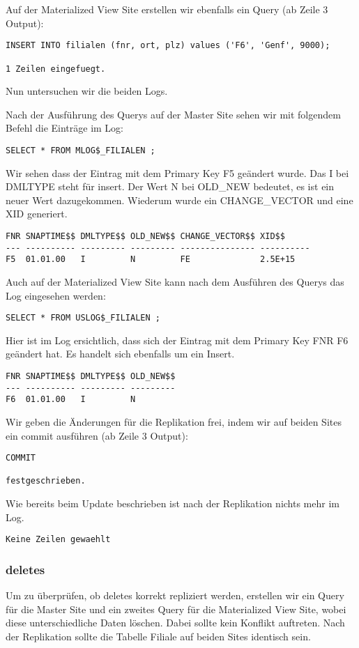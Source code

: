 \documentclass[11pt,a4paper,parskip=half]{scrartcl}
\begin{document}
Auf der Materialized View Site erstellen wir ebenfalls ein Query (ab Zeile 3 Output):
\begin{lstlisting}
INSERT INTO filialen (fnr, ort, plz) values ('F6', 'Genf', 9000);

1 Zeilen eingefuegt.
\end{lstlisting}

Nun untersuchen wir die beiden Logs.

Nach der Ausführung des Querys auf der Master Site sehen wir mit folgendem Befehl die Einträge im Log:
\begin{lstlisting}
SELECT * FROM MLOG$_FILIALEN ;
\end{lstlisting}

Wir sehen dass der Eintrag mit dem Primary Key F5 geändert wurde. Das I bei DMLTYPE steht für insert. Der Wert N bei OLD\_NEW bedeutet, es ist ein neuer Wert dazugekommen. Wiederum wurde ein CHANGE\_VECTOR und eine XID generiert.
\begin{lstlisting}
FNR SNAPTIME$$ DMLTYPE$$ OLD_NEW$$ CHANGE_VECTOR$$ XID$$
--- ---------- --------- --------- --------------- ----------
F5  01.01.00   I         N         FE              2.5E+15 
\end{lstlisting}

Auch auf der Materialized View Site kann nach dem Ausführen des Querys das Log eingesehen werden:
\begin{lstlisting}
SELECT * FROM USLOG$_FILIALEN ;
\end{lstlisting}

Hier ist im Log ersichtlich, dass sich der Eintrag mit dem Primary Key FNR F6 geändert hat. Es handelt sich ebenfalls um ein Insert.
\begin{lstlisting}
FNR SNAPTIME$$ DMLTYPE$$ OLD_NEW$$
--- ---------- --------- ---------
F6  01.01.00   I         N         
\end{lstlisting}

Wir geben die Änderungen für die Replikation frei, indem wir auf beiden Sites ein commit ausführen (ab Zeile 3 Output):
\begin{lstlisting}
COMMIT

festgeschrieben.
\end{lstlisting}

Wie bereits beim Update beschrieben ist nach der Replikation nichts mehr im Log.
\begin{lstlisting}
Keine Zeilen gewaehlt
\end{lstlisting}

\subsubsection{deletes}
Um zu überprüfen, ob deletes korrekt repliziert werden, erstellen wir ein Query für die Master Site und ein zweites Query für die Materialized View Site, wobei diese unterschiedliche Daten löschen. Dabei sollte kein Konflikt auftreten. Nach der Replikation sollte die Tabelle Filiale auf beiden Sites identisch sein.
\end{document}
